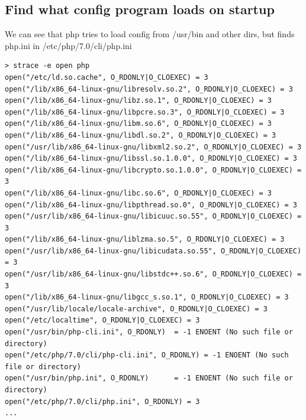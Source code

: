 \documentclass[10pt]{article}
\begin{document}
\subsection{Find what config program loads on startup}
We can see that php tries to load config from /usr/bin and other dirs, but finds php.ini in /etc/php/7.0/cli/php.ini
\begin{verbatim}
> strace -e open php
open("/etc/ld.so.cache", O_RDONLY|O_CLOEXEC) = 3
open("/lib/x86_64-linux-gnu/libresolv.so.2", O_RDONLY|O_CLOEXEC) = 3
open("/lib/x86_64-linux-gnu/libz.so.1", O_RDONLY|O_CLOEXEC) = 3
open("/lib/x86_64-linux-gnu/libpcre.so.3", O_RDONLY|O_CLOEXEC) = 3
open("/lib/x86_64-linux-gnu/libm.so.6", O_RDONLY|O_CLOEXEC) = 3
open("/lib/x86_64-linux-gnu/libdl.so.2", O_RDONLY|O_CLOEXEC) = 3
open("/usr/lib/x86_64-linux-gnu/libxml2.so.2", O_RDONLY|O_CLOEXEC) = 3
open("/lib/x86_64-linux-gnu/libssl.so.1.0.0", O_RDONLY|O_CLOEXEC) = 3
open("/lib/x86_64-linux-gnu/libcrypto.so.1.0.0", O_RDONLY|O_CLOEXEC) = 3
open("/lib/x86_64-linux-gnu/libc.so.6", O_RDONLY|O_CLOEXEC) = 3
open("/lib/x86_64-linux-gnu/libpthread.so.0", O_RDONLY|O_CLOEXEC) = 3
open("/usr/lib/x86_64-linux-gnu/libicuuc.so.55", O_RDONLY|O_CLOEXEC) = 3
open("/lib/x86_64-linux-gnu/liblzma.so.5", O_RDONLY|O_CLOEXEC) = 3
open("/usr/lib/x86_64-linux-gnu/libicudata.so.55", O_RDONLY|O_CLOEXEC) = 3
open("/usr/lib/x86_64-linux-gnu/libstdc++.so.6", O_RDONLY|O_CLOEXEC) = 3
open("/lib/x86_64-linux-gnu/libgcc_s.so.1", O_RDONLY|O_CLOEXEC) = 3
open("/usr/lib/locale/locale-archive", O_RDONLY|O_CLOEXEC) = 3
open("/etc/localtime", O_RDONLY|O_CLOEXEC) = 3
open("/usr/bin/php-cli.ini", O_RDONLY)  = -1 ENOENT (No such file or directory)
open("/etc/php/7.0/cli/php-cli.ini", O_RDONLY) = -1 ENOENT (No such file or directory)
open("/usr/bin/php.ini", O_RDONLY)      = -1 ENOENT (No such file or directory)
open("/etc/php/7.0/cli/php.ini", O_RDONLY) = 3
...
\end{verbatim}
\end{document}

